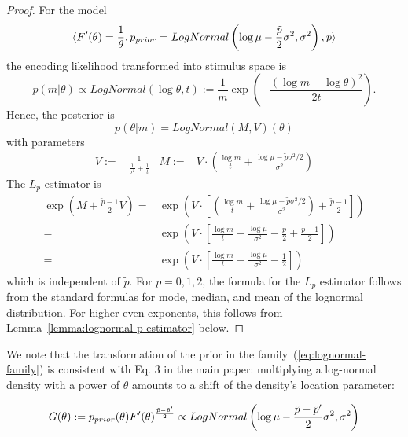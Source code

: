 \begin{proof}
    For the model
    \begin{equation}
        \langle F'(\theta) = \frac{1}{\theta}, p_{prior} = LogNormal\left(\log \mu - \frac{\tilde{p}}{2}\sigma^2, \sigma^2\right), {p}\rangle
    \end{equation}
    the encoding likelihood transformed into stimulus space is
    \begin{equation}
        p(m|\theta) \propto LogNormal(\log \theta, t) := \frac{1}{m} \exp\left(-\frac{(\log m - \log \theta)^2}{2t}\right).
\end{equation}
    Hence, the posterior is
\begin{equation}
    p(\theta|m) = LogNormal(M, V)(\theta)
\end{equation}
with parameters
\begin{align*} 
V := &\frac{1}{\frac{1}{\sigma^2}+\frac{1}{t}} &
    M := &V \cdot \left(\frac{\log m}{t} + \frac{\log\mu - \tilde{p}\sigma^2/2}{\sigma^2}\right)
\end{align*}
The $L_{{p}}$ estimator is 
    \begin{align*}
        \exp(M + \frac{\tilde{p}-1}{2} V) =& \exp(V \cdot \left[\left(\frac{\log m}{t} + \frac{\log\mu - \tilde{p}\sigma^2/2}{\sigma^2}\right) + \frac{\tilde{p}-1}{2}\right]) \\
        =& \exp(V \cdot \left[\frac{\log m}{t} + \frac{\log\mu }{\sigma^2} - \frac{\tilde{p}}{2}  + \frac{\tilde{p}-1}{2}\right]) \\
        =& \exp(V \cdot \left[\frac{\log m}{t} + \frac{\log\mu }{\sigma^2}   - \frac{1}{2}\right])
    \end{align*}
    which is independent of $\tilde{p}$.
    For $p=0,1,2$, the formula for the $L_p$ estimator follows from the standard formulas for mode, median, and mean of the lognormal distribution.
    For higher even exponents, this follows from Lemma~\ref{lemma:lognormal-p-estimator} below.
    
    
\end{proof}
We note that the transformation of the prior in the family~(\ref{eq:lognormal-family}) is consistent with Eq. 3 in the main paper: multiplying a log-normal density with a power of $\theta$ amounts to a shift of the density's location parameter:
\begin{lemma}
\begin{align*}
  G(\theta) :=  p_{prior}(\theta) F'(\theta)^{\frac{\tilde{p}-\tilde{p}'}{2}} \propto LogNormal\left(\log\mu - \frac{\tilde{p}-\tilde{p}'}{2}\sigma^2, \sigma^2\right)
\end{align*}
\end{lemma}
